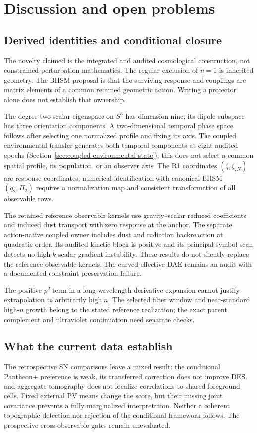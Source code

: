 \section{Discussion and open problems}
\subsection{Derived identities and conditional closure}
The novelty claimed is the integrated and audited cosmological construction,
not constrained-perturbation mathematics. The regular exclusion of $n=1$
is inherited geometry. The BHSM proposal is that the surviving response
and couplings are matrix elements of a common retained geometric action.
Writing a projector alone does not establish that ownership.

The degree-two scalar eigenspace on $S^3$ has dimension nine; its dipole
subspace has three orientation components. A two-dimensional temporal phase
space follows after selecting one normalized profile and fixing its axis.
The coupled environmental transfer generates both temporal components at
eight audited epochs (Section~\ref{sec:coupled-environmental-state}); this
does not select a common spatial profile, its population, or an observer axis.
The R1 coordinates $(\zeta,\zeta_{,N})$ are response coordinates; numerical
identification with canonical BHSM $(q_2,\Pi_2)$ requires a normalization
map and consistent transformation of all observable rows.

The retained reference observable kernels use gravity--scalar reduced
coefficients and induced dust transport with zero response at the anchor.
The separate action-native coupled owner includes dust and radiation
backreaction at quadratic order. Its audited kinetic block is positive and
its principal-symbol scan detects no high-$k$ scalar gradient instability.
These results do not silently replace the reference observable kernels.
The curved effective DAE remains an audit with a documented
constraint-preservation failure.

The positive $p^2$ term in a long-wavelength derivative expansion cannot
justify extrapolation to arbitrarily high $n$. The selected filter window
and near-standard high-$n$ growth belong to the stated reference realization;
the exact parent complement and ultraviolet continuation need separate checks.

\subsection{What the current data establish}
The retrospective SN comparisons leave a mixed result: the conditional
Pantheon+ preference is weak, its transferred correction does not improve
DES, and aggregate tomography does not localize correlations to shared
foreground cells. Fixed external PV means change the score, but their
missing joint covariance prevents a fully marginalized interpretation.
Neither a coherent topographic detection nor rejection of the conditional
framework follows. The prospective cross-observable gates remain unevaluated.

